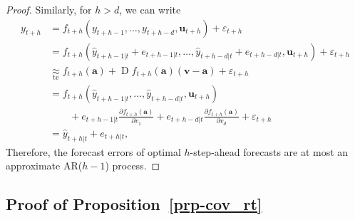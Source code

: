 \documentclass[
  11pt,
  a4paper,
]{article}
\theoremstyle{plain}
\theoremstyle{remark}
\begin{document}
\begin{proof}
Similarly, for \(h > d\), we can write \begin{align*}
y_{t+h}
&= f_{t+h}(y_{t+h-1},\dots,y_{t+h-d},\bm{u}_{t+h})+\varepsilon_{t+h} \\
&= f_{t+h}(\hat{y}_{t+h-1|t}+e_{t+h-1|t},\dots,\hat{y}_{t+h-d|t}+e_{t+h-d|t},\bm{u}_{t+h})+\varepsilon_{t+h} \\
&\underset{\text{te}}{\approx} f_{t+h}(\bm{a})+\operatorname{D}f_{t+h}(\bm{a})(\bm{v}-\bm{a})+
\varepsilon_{t+h} \\
&= f_{t+h}(\hat{y}_{t+h-1|t},\dots,\hat{y}_{t+h-d|t},\bm{u}_{t+h}) \\
&\mbox{}\qquad +e_{t+h-1|t}\frac{\partial f_{t+h}(\bm{a})}{\partial v_1}+e_{t+h-d|t}\frac{\partial f_{t+h}(\bm{a})}{\partial v_{d}}+\varepsilon_{t+h} \\
&= \hat{y}_{t+h|t}+e_{t+h|t},
\end{align*} Therefore, the forecast errors of optimal \(h\)-step-ahead
forecasts are at most an approximate AR(\(h-1\)) process.
\end{proof}

\subsection{\texorpdfstring{Proof of
Proposition~\ref{prp-cov_rt}}{Proof of Proposition~}}\label{sec-proof_cov_rt}
\end{document}
